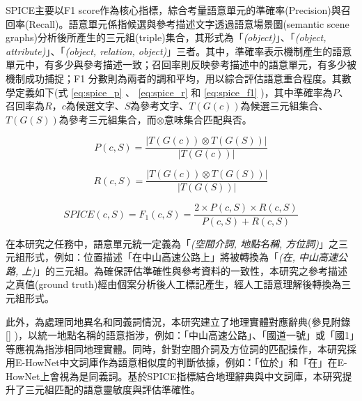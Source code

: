 SPICE主要以F1 score作為核心指標，綜合考量語意單元的準確率(Precision)與召回率(Recall)。語意單元係指候選與參考描述文字透過語意場景圖(semantic scene graphs)分析後所產生的三元組(triple)集合，其形式為「\textit{(object)}」、「\textit{(object, attribute)}」、「\textit{(object, relation, object)}」三者。其中，準確率表示機制產生的語意單元中，有多少與參考描述一致；召回率則反映參考描述中的語意單元，有多少被機制成功捕捉；F1 分數則為兩者的調和平均，用以綜合評估語意重合程度。其數學定義如下(式 \ref{eq:spice_p} 、 \ref{eq:spice_r} 和 \ref{eq:spice_f1} )，其中準確率為$P$、召回率為$R$，$c$為候選文字、$S$為參考文字、$T(G(c))$為候選三元組集合、$T(G(S))$為參考三元組集合，而$\otimes$意味集合匹配與否。

\begin{equation}
\label{eq:spice_p}
P(c,S) = \frac{\left| T(G(c)) \otimes T(G(S)) \right|}{\left| T(G(c)) \right|}
\end{equation}

\begin{equation}
\label{eq:spice_r}
R(c,S) = \frac{\left| T(G(c)) \otimes T(G(S)) \right|}{\left| T(G(S)) \right|}
\end{equation}

\begin{equation}
\label{eq:spice_f1}
SPICE(c,S) = F_1(c,S) = \frac{2 \times P(c,S) \times R(c,S)}{P(c,S) + R(c,S)}
\end{equation}

在本研究之任務中，語意單元統一定義為「\textit{(空間介詞, 地點名稱, 方位詞)}」之三元組形式，例如：位置描述「在中山高速公路上」將被轉換為「\textit{(在, 中山高速公路, 上)}」的三元組。為確保評估準確性與參考資料的一致性，本研究之參考描述之真值(ground truth)經由個案分析後人工標記產生，經人工語意理解後轉換為三元組形式。

此外，為處理同地異名和同義詞情況，本研究建立了地理實體對應辭典(參見附錄 \ref{} )，以統一地點名稱的語意指涉，例如：「中山高速公路」、「國道一號」或「國1」等應視為指涉相同地理實體。同時，針對空間介詞及方位詞的匹配操作，本研究採用E-HowNet中文詞庫作為語意相似度的判斷依據，例如：「位於」和「在」在E-HowNet上會視為是同義詞。基於SPICE指標結合地理辭典與中文詞庫，本研究提升了三元組匹配的語意靈敏度與評估準確性。


